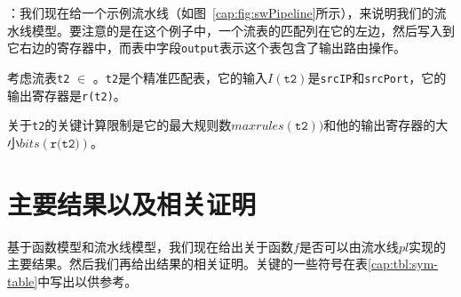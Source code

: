 ：我们现在给一个示例流水线\exampledp（如图~\ref{cap:fig:swPipeline}所示），来说明我们的流水线模型。要注意的是在这个例子中，一个流表的匹配列在它的左边，然后写入到它右边的寄存器中，而表中字段\texttt{output}表示这个表包含了输出路由操作。




考虑流表\texttt{t2} $\in$ \exampledp。\texttt{t2}是个精准匹配表，它的输入$I(\texttt{t2})$是\texttt{srcIP}和\texttt{srcPort}，它的输出寄存器是\texttt{r(t2)}。

关于\texttt{t2}的关键计算限制是它的最大规则数$maxrules(\texttt{t2}))$和他的输出寄存器的大小$bits(\texttt{r(t2)})$。









\section{主要结果以及相关证明}
\label{sec:main-results}

基于函数模型和流水线模型，我们现在给出关于函数$f$是否可以由流水线$pl$实现的主要结果。然后我们再给出结果的相关证明。关键的一些符号在表\ref{cap:tbl:sym-table}中写出以供参考。

